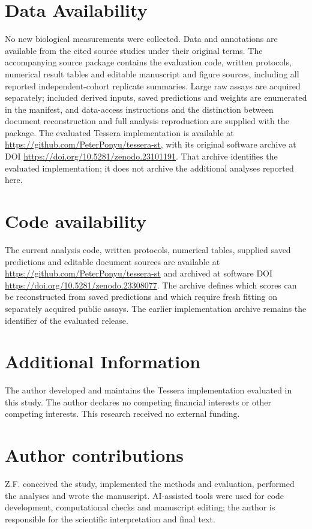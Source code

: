 \documentclass[11pt]{article}
\begin{document}
\section*{Data Availability}
No new biological measurements were collected. Data and annotations are available from the cited source studies under their original terms. The accompanying source package contains the evaluation code, written protocols, numerical result tables and editable manuscript and figure sources, including all reported independent-cohort replicate summaries. Large raw assays are acquired separately; included derived inputs, saved predictions and weights are enumerated in the manifest, and data-access instructions and the distinction between document reconstruction and full analysis reproduction are supplied with the package. The evaluated Tessera implementation is available at \url{https://github.com/PeterPonyu/tessera-st}, with its original software archive at DOI \url{https://doi.org/10.5281/zenodo.23101191}. That archive identifies the evaluated implementation; it does not archive the additional analyses reported here.


\section*{Code availability}
The current analysis code, written protocols, numerical tables, supplied saved predictions and editable document sources are available at \url{https://github.com/PeterPonyu/tessera-st} and archived at software DOI \url{https://doi.org/10.5281/zenodo.23308077}. The archive defines which scores can be reconstructed from saved predictions and which require fresh fitting on separately acquired public assays. The earlier implementation archive remains the identifier of the evaluated release.

\section*{Additional Information}
The author developed and maintains the Tessera implementation evaluated in this study. The author declares no competing financial interests or other competing interests. This research received no external funding.
{\small\setlength{\bibsep}{2pt}\par}

\section*{Author contributions}
Z.F. conceived the study, implemented the methods and evaluation, performed the analyses and wrote the manuscript. AI-assisted tools were used for code development, computational checks and manuscript editing; the author is responsible for the scientific interpretation and final text.
\end{document}
